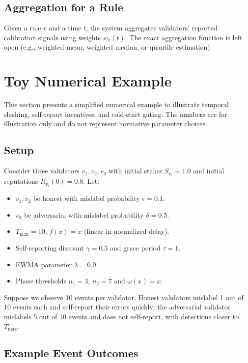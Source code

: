 \documentclass[11pt]{article}
\theoremstyle{plain}
\theoremstyle{definition}
\begin{document}
\subsection{Aggregation for a Rule}

Given a rule \(r\) and a time \(t\), the system aggregates validators’ reported calibration signals using weights \(w_v(t)\). The exact aggregation function is left open (e.g., weighted mean, weighted median, or quantile estimation).

\section{Toy Numerical Example}

This section presents a simplified numerical example to illustrate temporal slashing, self-report incentives, and cold-start gating. The numbers are for illustration only and do not represent normative parameter choices.

\subsection{Setup}

Consider three validators \(v_1, v_2, v_3\) with initial stakes \(S_{v_i} = 1.0\) and initial reputations \(R_{v_i}(0) = 0.8\). Let:
\begin{itemize}[leftmargin=*]
  \item \(v_1, v_2\) be honest with mislabel probability \(\epsilon = 0.1\).
  \item \(v_3\) be adversarial with mislabel probability \(\delta = 0.5\).
  \item \(T_{\max} = 10\), \(f(x) = x\) (linear in normalized delay).
  \item Self-reporting discount \(\gamma = 0.3\) and grace period \(\tau = 1\).
  \item EWMA parameter \(\lambda = 0.9\).
  \item Phase thresholds \(n_1 = 3\), \(n_2 = 7\) and \(\omega(x) = x\).
\end{itemize}

Suppose we observe 10 events per validator. Honest validators mislabel 1 out of 10 events each and self-report their errors quickly; the adversarial validator mislabels 5 out of 10 events and does not self-report, with detections closer to \(T_{\max}\).

\subsection{Example Event Outcomes}
\end{document}
